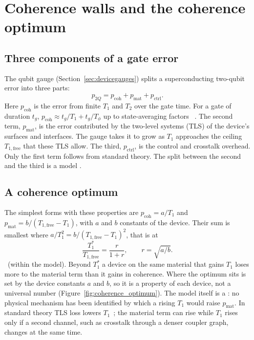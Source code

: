 \chapter{Coherence walls and the coherence optimum}\label{ch:walls}

\section{Three components of a gate error}

The qubit gauge (Section~\ref{sec:devicegauges}) splits a superconducting two-qubit error into three parts:
\begin{equation}
 p_{2Q}=p_{\mathrm{coh}}+p_{\mathrm{mat}}+p_{\mathrm{ctrl}} .
 \label{eq:pdecomp}
\end{equation}
Here $p_{\mathrm{coh}}$ is the error from finite $T_1$ and $T_2$ over the gate time. For a gate of duration $t_g$,
$p_{\mathrm{coh}}\approx t_g/T_1+t_g/T_\phi$ up to state-averaging factors~\cite{Abad2022} \derived. The second term,
$p_{\mathrm{mat}}$, is the error contributed by the two-level systems (TLS) of the device's surfaces and
interfaces. The gauge takes it to grow as $T_1$ approaches the ceiling $T_{1,\mathrm{free}}$ that these TLS allow.
The third, $p_{\mathrm{ctrl}}$, is the control and crosstalk overhead. Only the first term follows from standard theory.
The split between the second and the third is a model \conjecture.

\section{A coherence optimum}

The simplest forms with these properties are $p_{\mathrm{coh}}=a/T_1$ and $p_{\mathrm{mat}}=b/(T_{1,\mathrm{free}}-T_1)$,
with $a$ and $b$ constants of the device. Their sum is smallest where $a/T_1^2=b/(T_{1,\mathrm{free}}-T_1)^2$, that is at
\begin{equation}
 \frac{T_1^*}{T_{1,\mathrm{free}}}=\frac{r}{1+r},\qquad r=\sqrt{a/b}.
 \label{eq:t1star}
\end{equation}
\derived\ (within the model). Beyond $T_1^*$ a device on the same material that gains $T_1$ loses more to the material
term than it gains in coherence. Where the optimum sits is set by the device constants $a$ and $b$, so it is a property of each
device, not a universal number (Figure~\ref{fig:coherence_optimum}). The model itself is a \conjecture: no physical mechanism has been identified by
which a rising $T_1$ would raise $p_{\mathrm{mat}}$. In standard theory TLS loss lowers $T_1$~\cite{Martinis2005,Muller2019};
the material term can rise while $T_1$ rises only if a second channel, such as crosstalk through a denser coupler
graph, changes at the same time.

